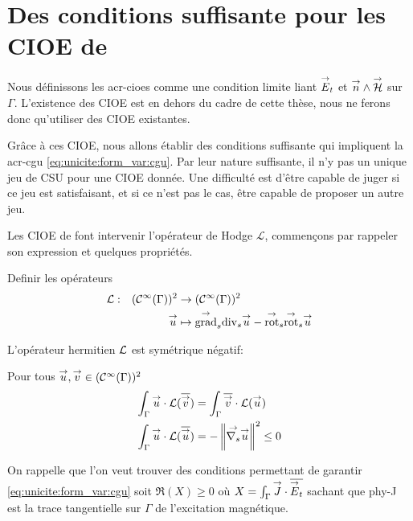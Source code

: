 \section[Des CSU pour les CIOE de Stupfel et Poget 2011]{Des conditions suffisante pour les CIOE de \cite{stupfel_sufficient_2011}}

  Nous définissons les \glspl{acr-cioe} comme une condition limite liant \({\overset{\rightarrow}{E}}_t\) et \({\overset{\rightarrow}{n}}\wedge{\overset{\rightarrow}{\mathcal{H}}}\) sur \(\Gamma\). L'existence des CIOE est en dehors du cadre de cette thèse, nous ne ferons donc qu'utiliser des CIOE existantes.

  Grâce à ces CIOE, nous allons établir des conditions suffisante qui impliquent la \gls{acr-cgu} \eqref{eq:unicite:form_var:cgu}. Par leur nature suffisante, il n'y pas un unique jeu de CSU pour une CIOE donnée. Une difficulté est d'être capable de juger si ce jeu est satisfaisant, et si ce n'est pas le cas, être capable de proposer un autre jeu.

  Les CIOE de \cite{stupfel_sufficient_2011} font intervenir l'opérateur de Hodge \(\mathcal{L}\), commençons par rappeler son expression et quelques propriétés.

  \begin{defn}
    Definir les opérateurs
    \begin{equation}
      \label{eq:operator:L}
        \fonction{\LL}{(\mathcal{C}^\infty(\Gamma))^2}{(\mathcal{C}^\infty(\Gamma))^2}%
          {\vu}{\tgrads{\tdivs \vu} - \tvrots{\tvrots \vu}}
    \end{equation}
  \end{defn}

  \begin{prop}
    L’opérateur hermitien \(\mathcal{L}\) est symétrique négatif:

    Pour tous \({\overset{\rightarrow}{u}},{\overset{\rightarrow}{v}} \in (\mathcal C^\infty(\Gamma))^2\)
    \begin{align}
      \int_\Gamma {\overset{\rightarrow}{u}}\cdot \mathcal{L}({\overline{{\overset{\rightarrow}{v}}}}) &= \int_\Gamma {\overline{{\overset{\rightarrow}{v}}}}\cdot \mathcal{L}({\overset{\rightarrow}{u}})
      \\
      \int_\Gamma {\overset{\rightarrow}{u}}\cdot \mathcal{L}({\overline{{\overset{\rightarrow}{u}}}}) &= -\left\lVert{\overset{\rightarrow}{\nabla_s}}{{\overset{\rightarrow}{u}}}\right\rVert^2 \le 0
      \label{eq:hodge:negatif}
    \end{align}
  \end{prop}

  On rappelle que l'on veut trouver des conditions permettant de garantir \eqref{eq:unicite:form_var:cgu} soit \(\Re(X)\ge0\) où \(X = \int_\Gamma {\overset{\rightarrow}{J}} \cdot {\overline{{\overset{\rightarrow}{E}}_t}}\) sachant que \gls{phy-J} est la trace tangentielle sur \(\Gamma\) de l’excitation magnétique.


